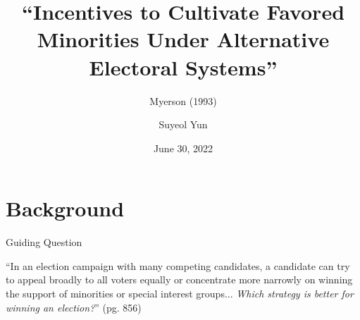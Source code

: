 \documentclass{beamer}
\begin{document}
	\title[Myerson (1993)]{``Incentives to Cultivate Favored Minorities Under Alternative Electoral Systems''}
	\subtitle{Myerson (1993)}
	\author[Suyeol]{Suyeol Yun}
	\date{June 30, 2022}
	\frame{\titlepage}
	\section{Background}
	\begin{frame}{Guiding Question}
		\begin{block}{}
			{\large ``In an election campaign with many competing candidates, a candidate can try to appeal broadly to all voters equally or concentrate more narrowly on winning the support of minorities or special interest groups...
				\vskip5mm
				\textit{Which strategy is better for winning an election?}'' (pg. 856)}
		\end{block}
	\end{frame}
\end{document}
